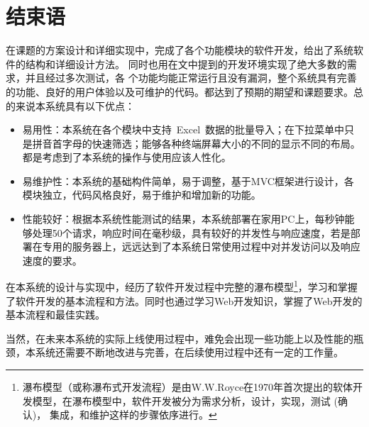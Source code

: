 
\chapter{结束语}
在课题的方案设计和详细实现中，完成了各个功能模块的软件开发，给出了系统软件的结构和详细设计方法。
同时也用在文中提到的开发环境实现了绝大多数的需求，并且经过多次测试，各
个功能均能正常运行且没有漏洞，整个系统具有完善的功能、良好的用户体验以及可维护的代码。都达到了预期的期望和课题要求。总的来说本系统具有以下优点：

\begin{itemize}
\item 易用性：本系统在各个模块中支持~Excel~数据的批量导入；在下拉菜单中只是拼音首字母的快速筛选；能够各种终端屏幕大小的不同的显示不同的布局。都是考虑到了本系统的操作与使用应该人性化。
\item 易维护性：本系统的基础构件简单，易于调整，基于MVC框架进行设计，各模块独立，代码风格良好，易于维护和增加新的功能。
\item 性能较好：根据本系统性能测试的结果，本系统部署在家用PC上，每秒钟能够处理50个请求，响应时间在毫秒级，具有较好的并发性与响应速度，若是部署在专用的服务器上，远远达到了本系统日常使用过程中对并发访问以及响应速度的要求。
\end{itemize}


在本系统的设计与实现中，经历了软件开发过程中完整的瀑布模型\footnote{瀑布模型（或称瀑布式开发流程）是由W.W.Royce在1970年首次提出的软体开发模型，在瀑布模型中，软件开发被分为需求分析，设计，实现，测试 (确认)， 集成，和维护这样的步骤依序进行。}，学习和掌握了软件开发的基本流程和方法。同时也通过学习Web开发知识，掌握了Web开发的基本流程和最佳实践。

当然，在未来本系统的实际上线使用过程中，难免会出现一些功能上以及性能的瓶颈，本系统还需要不断地改进与完善，在后续使用过程中还有一定的工作量。